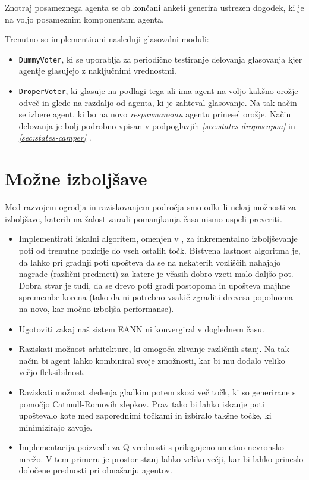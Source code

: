 \documentclass[a4paper,10pt]{article}
\begin{document}
Znotraj posameznega agenta se ob končani anketi generira ustrezen dogodek, ki je na voljo posameznim komponentam agenta.

Trenutno so implementirani naslednji glasovalni moduli:
\begin{itemize}
  \item \texttt{DummyVoter}, ki se uporablja za periodično testiranje delovanja glasovanja kjer agentje glasujejo z naključnimi vrednostmi.
  
  \item \texttt{DroperVoter}, ki glasuje na podlagi tega ali ima agent na voljo kakšno orožje odveč in glede na razdaljo od agenta, ki je zahteval glasovanje. Na tak način se izbere agent, ki bo na novo \textit{respawnanemu} agentu prinesel orožje. Način delovanja je bolj podrobno vpisan v podpoglavjih \textit{\ref{sec:states-dropweapon} } in \textit{\ref{sec:states-camper} }.
\end{itemize} 

\section{Možne izboljšave}

Med razvojem ogrodja in raziskovanjem področja smo odkrili nekaj možnosti za izboljšave, katerih na žalost zaradi pomanjkanja časa nismo uspeli preveriti.

\begin{itemize}
  \item Implementirati iskalni algoritem, omenjen v \cite{champandard02}, za inkrementalno izboljševanje poti od trenutne pozicije do vseh ostalih točk. Bistvena lastnost algoritma je, da lahko pri gradnji poti upošteva da se na nekaterih vozliščih nahajajo nagrade (različni predmeti) za katere je včasih dobro vzeti malo daljšo pot. Dobra stvar je tudi, da se drevo poti gradi postopoma in upošteva majhne spremembe korena (tako da ni potrebno vsakič zgraditi drevesa popolnoma na novo, kar močno izboljša performanse).
  
  \item Ugotoviti zakaj naš sistem EANN ni konvergiral v doglednem času.
  
  \item Raziskati možnost arhitekture, ki omogoča zlivanje različnih stanj. Na tak način bi agent lahko kombiniral svoje zmožnosti, kar bi mu dodalo veliko večjo fleksibilnost.
  
  \item Raziskati možnost sledenja gladkim potem skozi več točk, ki so generirane s pomočjo Catmull-Romovih zlepkov. Prav tako bi lahko iskanje poti upoštevalo kote med zaporednimi točkami in izbiralo takšne točke, ki minimizirajo zavoje.

  \item Implementacija poizvedb za Q-vrednosti s prilagojeno umetno nevronsko mrežo. V tem primeru je prostor stanj lahko veliko večji, kar bi lahko prineslo določene prednosti pri obnašanju agentov.
\end{itemize}
\end{document}
